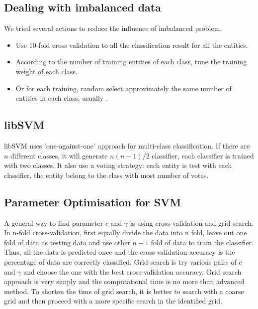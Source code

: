 \subsection{Dealing with imbalanced data}
We tried several actions to reduce the influence of imbalanced problem.
\begin{itemize}
\item Use 10-fold cross validation to all the classification result for all the entities. 
\item According to the number of training entities of each class, tune the training weight of each class.
\item Or for each training, random select approximately the same number of entities in each class, usually .
\end{itemize}
\subsection{libSVM}
libSVM uses 'one-against-one' approach for multi-class classification\cite{CC01a}. If there are $n$ different classes, it will generate $n(n-1)/2$ classifier, each classifier is trained with two classes. It also use a voting strategy: each entity is test with each classifier, the entity belong to the class with most number of votes.
\subsection{Parameter Optimisation for SVM}
A general way to find parameter $c$ and $\gamma$ is using cross-validation and grid-search. In n-fold cross-validation, first equally divide the data into n fold, leave out one fold of data as testing data and use other $n-1$ fold of data to train the classifier. Thus, all the data is predicted once and the cross-validation accuracy is the percentage of data are correctly classified. 
Grid-search is try various pairs of $c$ and $\gamma$ and choose the one with the best cross-validation accuracy. Grid search approach is very simply and the computational time is no more than advanced method. To shorten the time of grid search, it is better to search with a coarse grid and then proceed with a more specific search in the identified grid.
